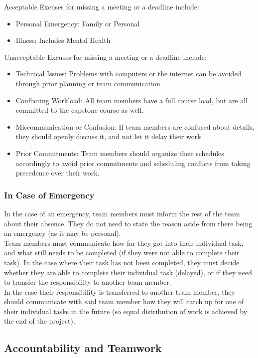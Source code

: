 \documentclass{article}
\begin{document}
Acceptable Excuses for missing a meeting or a deadline include:
\begin{itemize}
  \item Personal Emergency: Family or Personal
  \item Illness: Includes Mental Health
\end{itemize}

Unacceptable Excuses for missing a meeting or a deadline include:
\begin{itemize}
  \item Technical Issues: Problems with computers or the internet can be avoided through prior planning or team communication
  \item Conflicting Workload: All team members have a full course load, but are all committed to the capstone course as well.
  \item Miscommunication or Confusion: If team members are confused about details, they should openly discuss it, and not let it delay their work.
  \item Prior Commitments: Team members should organize their schedules accordingly to avoid prior commitments and scheduling conflicts from taking precedence over their work.
\end{itemize}

\subsubsection*{In Case of Emergency}

In the case of an emergency, team members must inform the rest of the team about their absence.
They do not need to state the reason aside from there being an emergency (as it may be personal).\\
\indent Team members must communicate how far they got into their individual task, and what still needs to be completed
(if they were not able to complete their task). In the case where their task has not been completed, they must
decide whether they are able to complete their individual task (delayed), or if they need to transfer
the responsibility to another team member.\\
\indent In the case their responsibility is transferred to another team member, they should communicate with said
team member how they will catch up for one of their individual tasks in the future (so equal distribution
of work is achieved by the end of the project).

\subsection*{Accountability and Teamwork}
\end{document}
